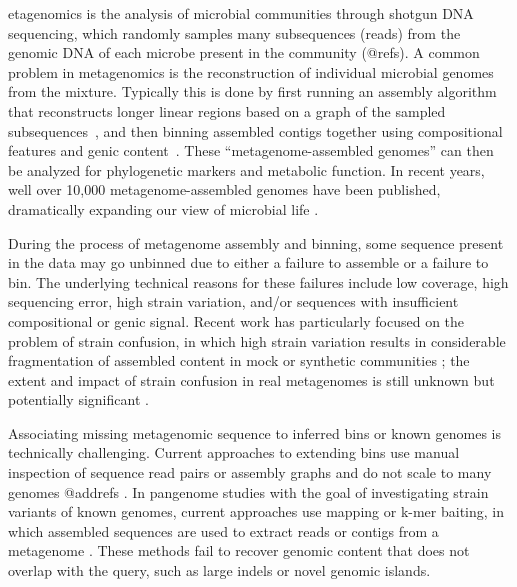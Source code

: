 etagenomics is the analysis of microbial communities through shotgun
DNA sequencing, which randomly samples many subsequences (reads)
from the genomic DNA of each microbe present in the community (@refs).
A common problem in metagenomics is the reconstruction of
individual microbial genomes from the mixture.
Typically this is
done by first running an assembly algorithm that reconstructs
longer linear regions based on a graph of the sampled
subsequences~\cite{pell2012scaling}, and then binning assembled
contigs together using compositional features and genic content~\cite{laczny2017busybee,lin2016accurate}.  These
``metagenome-assembled genomes'' can then be
analyzed for phylogenetic markers and metabolic function. In recent years,
well over 10,000 metagenome-assembled genomes have been published,
dramatically expanding our view of microbial life
\cite{Parks2017,Tully2018,Stewart2018,Delmont2018,Hug2016}.

During the process of metagenome assembly and binning, some
sequence present in the data may go unbinned due to either a failure
to assemble \cite{CAMI,Awad155358} or a failure to bin.
The underlying technical reasons for these failures include low
coverage, high sequencing error, high strain variation, and/or sequences
with insufficient compositional or genic signal.  Recent work has
particularly focused on the problem of strain confusion, in which
high strain variation results in considerable fragmentation of assembled
content in mock or synthetic communities \cite{CAMI,Awad155358}; the
extent and impact of strain confusion in real metagenomes is still unknown
but potentially significant \cite{brownstrain,Brito2016,baltic}.

Associating missing metagenomic sequence to inferred bins or known
genomes is technically challenging.  Current approaches to extending
bins use manual inspection of sequence read pairs or assembly graphs
and do not scale to many
genomes @addrefs \cite{perchlorate,metacherchant}. In pangenome studies with the
goal of investigating strain variants of known genomes,
 current approaches use mapping or k-mer baiting, in which
assembled sequences are used to extract reads or contigs from a
metagenome \cite{desman,Nayfach2016,ekg,mspminer}.
These methods fail to recover genomic content that does not overlap with
the query, such as large indels or novel genomic islands.

